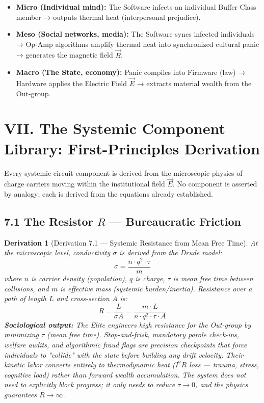 \documentclass[12pt]{book}
\numberwithin{equation}{chapter}
\newtheorem{derivation}{Derivation}[chapter]
\begin{document}
\begin{itemize}

\item \textbf{Micro (Individual mind):} The Software infects an individual Buffer Class member → outputs thermal heat (interpersonal prejudice).

\item \textbf{Meso (Social networks, media):} The Software syncs infected individuals → Op-Amp algorithms amplify thermal heat into synchronized cultural panic → generates the magnetic field $\vec{B}$.

\item \textbf{Macro (The State, economy):} Panic compiles into Firmware (law) → Hardware applies the Electric Field $\vec{E}$ → extracts material wealth from the Out-group.

\end{itemize}

\section{VII. The Systemic Component Library: First-Principles Derivation}

    Every systemic circuit component is derived from the microscopic physics of charge carriers moving within the institutional field $\vec{E}$. No component is asserted by analogy; each is derived from the equations already established.
  

\subsection{7.1 The Resistor $R$ — Bureaucratic Friction}

\begin{derivation}[Derivation 7.1 — Systemic Resistance from Mean Free Time]
At the microscopic level, conductivity $\sigma$ is derived from the Drude model:
      \[ \sigma = \frac{n \cdot q^2 \cdot \tau}{m} \]
    where $n$ is carrier density (population), $q$ is charge, $\tau$ is mean free time between collisions, and $m$ is effective mass (systemic burden/inertia). Resistance over a path of length $L$ and cross-section $A$ is:
      \[ R = \frac{L}{\sigma A} = \frac{m \cdot L}{n \cdot q^2 \cdot \tau \cdot A} \]
    \textbf{Sociological output:} The Elite engineers high resistance for the Out-group by minimizing $\tau$ (mean free time). Stop-and-frisk, mandatory parole check-ins, welfare audits, and algorithmic fraud flags are precision checkpoints that force individuals to "collide" with the state before building any drift velocity. Their kinetic labor converts entirely to thermodynamic heat ($I^2R$ loss — trauma, stress, cognitive load) rather than forward wealth accumulation. The system does not need to explicitly block progress; it only needs to reduce $\tau \to 0$, and the physics guarantees $R \to \infty$.
  \end{derivation}
\end{document}
